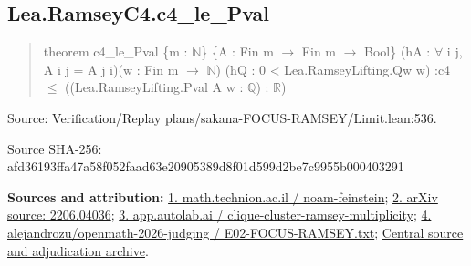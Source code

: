 \documentclass[11pt,a4paper]{article}
\begin{document}
\begin{samepage}
\subsection{Lea.RamseyC4.c4\_le\_Pval}
\begin{quote}\small\ttfamily theorem c4\_le\_Pval \{m : \ensuremath{\mathbb{N}}\} \{A : Fin m \ensuremath{\to} Fin m \ensuremath{\to} Bool\} (hA : \ensuremath{\forall} i j, A i j = A j i)\newline     (w : Fin m \ensuremath{\to} \ensuremath{\mathbb{N}}) (hQ : 0 < Lea.RamseyLifting.Qw w) :\newline     c4 \ensuremath{\leq} ((Lea.RamseyLifting.Pval A w : \ensuremath{\mathbb{Q}}) : \ensuremath{\mathbb{R}})\end{quote}
{\small Source: Verification/Replay plans/sakana-FOCUS-RAMSEY/Limit.lean:536.\par}

{\small Source SHA-256: afd36193ffa47a58f052faad63e20905389d8f01d599d2be7c9955b000403291\par}

{\small\textbf{Sources and attribution:} \href{https://math.technion.ac.il/events/noam-feinstein/}{1. math.technion.ac.il / noam-feinstein}; \href{https://arxiv.org/pdf/2206.04036}{2. arXiv source: 2206.04036}; \href{https://app.autolab.ai/hills/alejandrozu/clique-cluster-ramsey-multiplicity}{3. app.autolab.ai / clique-cluster-ramsey-multiplicity}; \href{https://github.com/alejandrozu/openmath-2026-judging/blob/d0ed487f487fa7ec814ff705ab55249983fe8707/OpenMath-Judging/review/entries/E02-FOCUS-RAMSEY.txt}{4. alejandrozu/openmath-2026-judging / E02-FOCUS-RAMSEY.txt}; \href{https://github.com/alejandrozu/openmath-2026-judging}{Central source and adjudication archive}.\par}

\end{samepage}
\end{document}
